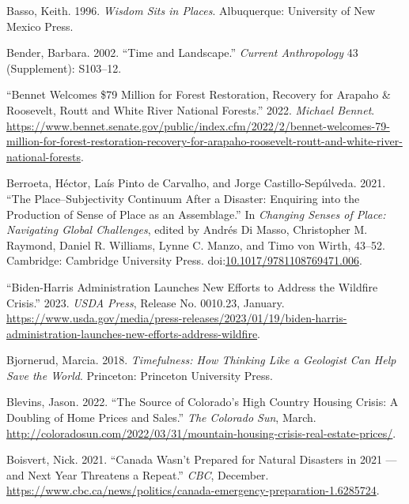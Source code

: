 \documentclass[
]{article}
\newlength{\cslhangindent}
\newenvironment{CSLReferences}[2] %
 {\begin{list}{}{%
  \setlength{\itemindent}{0pt}
  \setlength{\leftmargin}{0pt}
  \setlength{\parsep}{0pt}
  \ifodd #1
   \setlength{\leftmargin}{\cslhangindent}
   \setlength{\itemindent}{-1\cslhangindent}
  \fi
  \setlength{\itemsep}{#2\baselineskip}}}
 {\end{list}}
\begin{document}
\begin{CSLReferences}{1}{0}
Basso, Keith. 1996. \emph{Wisdom {Sits} in {Places}}. Albuquerque: University of New Mexico Press.

Bender, Barbara. 2002. {``Time and {Landscape}.''} \emph{Current Anthropology} 43 (Supplement): S103--12.

{``Bennet {Welcomes} \$79 {Million} for {Forest Restoration}, {Recovery} for {Arapaho} \& {Roosevelt}, {Routt} and {White River National Forests}.''} 2022. \emph{Michael Bennet}. \url{https://www.bennet.senate.gov/public/index.cfm/2022/2/bennet-welcomes-79-million-for-forest-restoration-recovery-for-arapaho-roosevelt-routt-and-white-river-national-forests}.

Berroeta, Héctor, Laís Pinto de Carvalho, and Jorge Castillo-Sepúlveda. 2021. {``The {Place}--{Subjectivity Continuum} After a {Disaster}: {Enquiring} into the {Production} of {Sense} of {Place} as an {Assemblage}.''} In \emph{Changing {Senses} of {Place}: {Navigating Global Challenges}}, edited by Andrés Di Masso, Christopher M. Raymond, Daniel R. Williams, Lynne C. Manzo, and Timo von Wirth, 43--52. Cambridge: Cambridge University Press. doi:\href{https://doi.org/10.1017/9781108769471.006}{10.1017/9781108769471.006}.

{``Biden-{Harris Administration Launches New Efforts} to {Address} the {Wildfire Crisis}.''} 2023. \emph{USDA Press}, Release {No}. 0010.23, January. \url{https://www.usda.gov/media/press-releases/2023/01/19/biden-harris-administration-launches-new-efforts-address-wildfire}.

Bjornerud, Marcia. 2018. \emph{Timefulness: How Thinking Like a Geologist Can Help Save the World}. Princeton: Princeton University Press.

Blevins, Jason. 2022. {``The Source of {Colorado}'s High Country Housing Crisis: A Doubling of Home Prices and Sales.''} \emph{The Colorado Sun}, March. \url{http://coloradosun.com/2022/03/31/mountain-housing-crisis-real-estate-prices/}.

Boisvert, Nick. 2021. {``Canada Wasn't Prepared for Natural Disasters in 2021 --- and Next Year Threatens a Repeat.''} \emph{CBC}, December. \url{https://www.cbc.ca/news/politics/canada-emergency-preparation-1.6285724}.


\end{CSLReferences}
\end{document}
